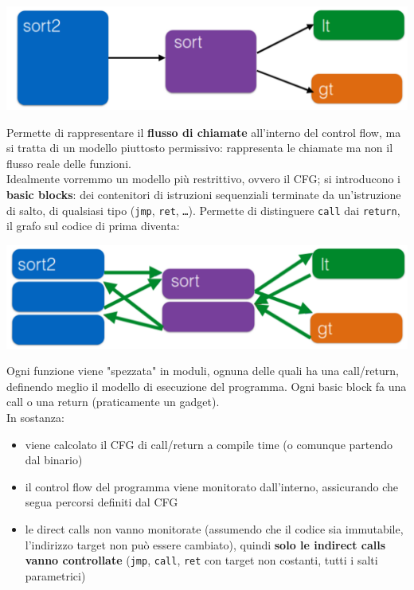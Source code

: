 \begin{center}
	\includegraphics[width=0.8\linewidth]{img/cfi/call1}
\end{center}

Permette di rappresentare il \textbf{flusso di chiamate} all'interno del control flow, ma si tratta di un modello piuttosto permissivo: rappresenta le chiamate ma non il flusso reale delle funzioni. \\

Idealmente vorremmo un modello più restrittivo, ovvero il CFG; si introducono i \textbf{basic blocks}: dei contenitori di istruzioni sequenziali terminate da un'istruzione di salto, di qualsiasi tipo (\texttt{jmp}, \texttt{ret}, \texttt{\dots}). Permette di distinguere \texttt{call} dai \texttt{return}, il grafo sul codice di prima diventa:
\begin{center}
	\includegraphics[width=0.8\linewidth]{img/cfi/call2}
\end{center}

Ogni funzione viene "spezzata" in moduli, ognuna delle quali ha una call/return, definendo meglio il modello di esecuzione del programma. Ogni basic block fa una call o una return (praticamente un gadget). \\

In sostanza: 
\begin{itemize}
	\item viene calcolato il CFG di call/return a compile time (o comunque partendo dal binario)
	\item il control flow del programma viene monitorato dall'interno, assicurando che segua percorsi definiti dal CFG
	\item le direct calls non vanno monitorate (assumendo che il codice sia immutabile, l'indirizzo target non può essere cambiato), quindi \textbf{solo le indirect calls vanno controllate} (\texttt{jmp}, \texttt{call}, \texttt{ret} con target non costanti, tutti i salti parametrici)
\end{itemize}

